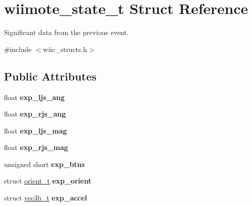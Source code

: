 \hypertarget{structwiimote__state__t}{\section{wiimote\-\_\-state\-\_\-t \-Struct \-Reference}
\label{structwiimote__state__t}
}


\-Significant data from the previous event.  




{\ttfamily \#include $<$wiic\-\_\-structs.\-h$>$}

\subsection*{\-Public \-Attributes}
\begin{DoxyCompactItemize}
\item 
\hypertarget{structwiimote__state__t_ab7b3b7f67410c6f05c50dcf8f2b15183}{float {\bfseries exp\-\_\-ljs\-\_\-ang}}\label{structwiimote__state__t_ab7b3b7f67410c6f05c50dcf8f2b15183}

\item 
\hypertarget{structwiimote__state__t_a2d1b33ecd8d40b092252b4d92fcb3b5c}{float {\bfseries exp\-\_\-rjs\-\_\-ang}}\label{structwiimote__state__t_a2d1b33ecd8d40b092252b4d92fcb3b5c}

\item 
\hypertarget{structwiimote__state__t_a7d839190a251d46851da469eb7b021fe}{float {\bfseries exp\-\_\-ljs\-\_\-mag}}\label{structwiimote__state__t_a7d839190a251d46851da469eb7b021fe}

\item 
\hypertarget{structwiimote__state__t_a244c7dc0a1d8398bee1a9ef9507a6dc0}{float {\bfseries exp\-\_\-rjs\-\_\-mag}}\label{structwiimote__state__t_a244c7dc0a1d8398bee1a9ef9507a6dc0}

\item 
\hypertarget{structwiimote__state__t_a7ddd1c96d28f9a6115fc0f800fbd388a}{unsigned short {\bfseries exp\-\_\-btns}}\label{structwiimote__state__t_a7ddd1c96d28f9a6115fc0f800fbd388a}

\item 
\hypertarget{structwiimote__state__t_ac225be6bf5d06fd370ad47386647e6e6}{struct \hyperlink{structorient__t}{orient\-\_\-t} {\bfseries exp\-\_\-orient}}\label{structwiimote__state__t_ac225be6bf5d06fd370ad47386647e6e6}

\item 
\hypertarget{structwiimote__state__t_a27a90665a24f25dd98021a5c1ff2d264}{struct \hyperlink{structvec3b__t}{vec3b\-\_\-t} {\bfseries exp\-\_\-accel}}\label{structwiimote__state__t_a27a90665a24f25dd98021a5c1ff2d264}


\end{DoxyCompactItemize}
